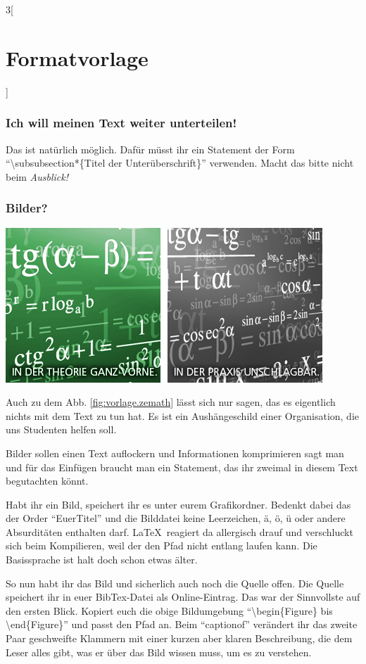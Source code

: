 \begin{multicols}{3}[\section{Formatvorlage}]
\subsubsection*{Ich will meinen Text weiter unterteilen!}
Das ist natürlich möglich. Dafür müsst ihr ein Statement der Form \enquote{\textbackslash subsubsection*\{Titel der Unterüberschrift\}} verwenden. Macht das bitte nicht beim \textit{Ausblick!}

\subsubsection*{Bilder?}
\begin{Figure}
\includegraphics[width=\linewidth]{Kapitel/Vorlage/Grafiken/sg_ft_zemath.png}
\label{fig:vorlage.zemath}
\end{Figure}
Auch zu dem Abb. \ref{fig:vorlage.zemath} lässt sich nur sagen, das es eigentlich nichts mit dem Text zu tun hat. Es ist ein Aushängeschild einer Organisation, die uns Studenten helfen soll.

Bilder sollen einen Text auflockern und Informationen komprimieren sagt man und für das Einfügen braucht man ein Statement, das ihr zweimal in diesem Text begutachten könnt. 

Habt ihr ein Bild, speichert ihr es unter eurem Grafikordner. Bedenkt dabei das der Order \enquote{EuerTitel} und die Bilddatei keine Leerzeichen, ä, ö, ü oder andere Absurditäten enthalten darf. \LaTeX~reagiert da allergisch drauf und verschluckt sich beim Kompilieren, weil der den Pfad nicht entlang laufen kann. Die Basissprache ist halt doch schon etwas älter.

So nun habt ihr das Bild und sicherlich auch noch die Quelle offen. Die Quelle speichert ihr in euer BibTex-Datei als Online-Eintrag. Das war der Sinnvollste auf den ersten Blick. Kopiert euch die obige Bildumgebung \enquote{\textbackslash begin\{Figure\} bis \textbackslash end\{Figure\}} und passt den Pfad an. Beim \enquote{captionof} verändert ihr das zweite Paar geschweifte Klammern mit einer kurzen aber klaren Beschreibung, die dem Leser alles gibt, was er über das Bild wissen muss, um es zu verstehen. 


\end{multicols}
